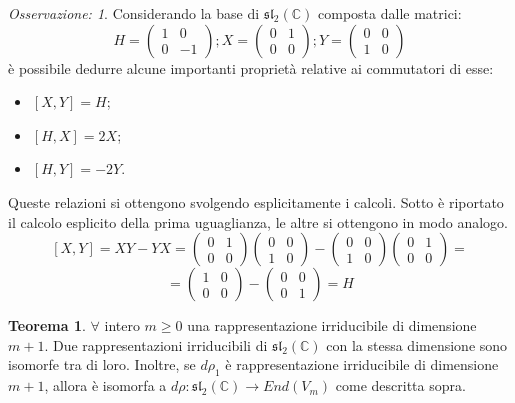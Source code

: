 \documentclass[12pt,a4paper]{report}
\theoremstyle{definition}
\newtheorem{Theo}[Def]{Teorema}
\theoremstyle{definition}
\theoremstyle{definition}
\theoremstyle{remark}
\newtheorem{Obs}[Def]{Osservazione:}
\begin{document}
\begin{Obs}\label{Obs1}
	Considerando la base di $\mathfrak{sl_2(\mathbb{C})}$ composta dalle matrici: $$H=
	\begin{pmatrix}
		1&0\\
		0&-1
	\end{pmatrix}; 
	X=\begin{pmatrix}
		0&1\\
		0&0
	\end{pmatrix};
	Y=\begin{pmatrix}
		0&0\\
		1&0
	\end{pmatrix}$$
è possibile dedurre alcune importanti proprietà relative ai commutatori di esse:
\begin{itemize}
	\item $[X,Y]=H$;
	\item $[H,X]=2X$;
	\item $[H,Y]=-2Y$.
\end{itemize}
Queste relazioni si ottengono svolgendo esplicitamente i calcoli. Sotto è riportato il calcolo esplicito della prima uguaglianza, le altre si ottengono in modo analogo.
$$[X,Y]=XY-YX=\begin{pmatrix}
	0&1\\
	0&0
\end{pmatrix}
\begin{pmatrix}
	0&0\\
	1&0
\end{pmatrix}-
\begin{pmatrix}
	0&0\\
	1&0
\end{pmatrix}
\begin{pmatrix}
	0&1\\
	0&0
\end{pmatrix}=$$$$=
\begin{pmatrix}
1&0\\
0&0
\end{pmatrix}-\begin{pmatrix}
0&0\\
0&1
\end{pmatrix}=H$$
\end{Obs}
\begin{Theo}
	$\forall$ intero $m\geq 0$ una rappresentazione irriducibile di dimensione $m+1$. Due rappresentazioni irriducibili di $\mathfrak{sl_2(\mathbb{C})}$ con la stessa dimensione sono isomorfe tra di loro. Inoltre, se $d\rho_1$ è rappresentazione irriducibile di dimensione $m+1$, allora è isomorfa a $d\rho:\mathfrak{sl_2(\mathbb{C})}\rightarrow End(V_m)$ come descritta sopra.
\end{Theo}
\end{document}
